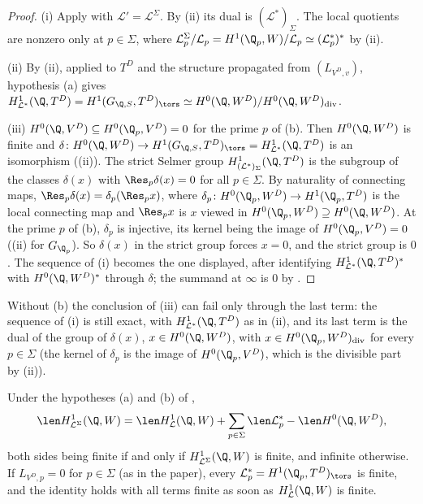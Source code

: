\begin{proof}
(i) Apply  with $\mathcal L'=\mathcal L^\Sigma$. By (ii) its dual is $(\mathcal L^*)_\Sigma$. The local quotients are nonzero only at
$p\in\Sigma$, where $\mathcal L^\Sigma_p/\mathcal L_p=H^1(\Q_p,W)/\mathcal L_p\simeq(\mathcal L^*_p)^*$ by (ii).

(ii) By (ii), applied to $T^D$ and the structure propagated from $(L_{V^D,v})$, hypothesis (a) gives
$H^1_{\mathcal L^*}(\Q,T^D)=H^1(G_{\Q,S},T^D)_{\tors}\simeq H^0(\Q,W^D)/H^0(\Q,W^D)_{\mathrm{div}}$.

(iii) $H^0(\Q,V^D)\subseteq H^0(\Q_p,V^D)=0$ for the prime $p$ of (b). Then $H^0(\Q,W^D)$ is finite and $\delta\colon H^0(\Q,W^D)\to H^1(G_{\Q,S},T^D)_{\tors}=H^1_{\mathcal L^*}(\Q,T^D)$ is an
isomorphism ((ii)). The strict Selmer group $H^1_{(\mathcal L^*)_\Sigma}(\Q,T^D)$ is the subgroup of the classes $\delta(x)$ with $\Res_p\delta(x)=0$ for all
$p\in\Sigma$. By naturality of connecting maps, $\Res_p\delta(x)=\delta_p(\Res_px)$, where $\delta_p\colon H^0(\Q_p,W^D)\to H^1(\Q_p,T^D)$ is the local connecting map and $\Res_px$ is $x$
viewed in $H^0(\Q_p,W^D)\supseteq H^0(\Q,W^D)$. At the prime $p$ of (b), $\delta_p$ is injective, its kernel being the image of $H^0(\Q_p,V^D)=0$ ((ii) for
$G_{\Q_p}$). So $\delta(x)$ in the strict group forces $x=0$, and the strict group is $0$. The sequence of (i) becomes the one displayed, after identifying
$H^1_{\mathcal L^*}(\Q,T^D)^*$ with $H^0(\Q,W^D)^*$ through $\delta$; the summand at $\infty$ is $0$ by .
\end{proof}

\begin{remark}
Without (b) the conclusion of (iii) can fail only through the last term: the sequence of (i) is still exact, with $H^1_{\mathcal L^*}(\Q,T^D)$ as in (ii), and its last term is the dual
of the group of $\delta(x)$, $x\in H^0(\Q,W^D)$, with $x\in H^0(\Q_p,W^D)_{\mathrm{div}}$ for every $p\in\Sigma$ (the kernel of $\delta_p$ is the image of $H^0(\Q_p,V^D)$, which is the
divisible part by (ii)).
\end{remark}

\begin{corollary}\label{cor:galcoh:length-identity}
Under the hypotheses (a) and (b) of ,
\[
\len H^1_{\mathcal L^\Sigma}(\Q,W)=\len H^1_{\mathcal L}(\Q,W)+\sum_{p\in\Sigma}\len\mathcal L^*_p-\len H^0(\Q,W^D),
\]
both sides being finite if and only if $H^1_{\mathcal L^\Sigma}(\Q,W)$ is finite, and infinite otherwise. If $L_{V^D,p}=0$ for $p\in\Sigma$ (as in the paper), every $\mathcal L^*_p=H^1(\Q_p,T^D)_{\tors}$ is
finite, and the identity holds with all terms finite as soon as $H^1_{\mathcal L}(\Q,W)$ is finite.
\end{corollary}

